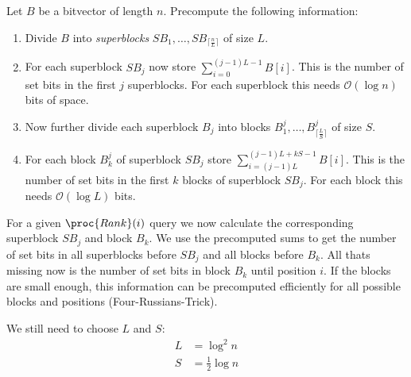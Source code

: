 \begin{Proof}
  Let $B$ be a bitvector of length $n$. Precompute the following information:
  \begin{enumerate}
    \item Divide $B$ into \emph{superblocks} $SB_1, \ldots, SB_{\lceil \frac{n}{L} \rceil}$ of size $L$.
    \item For each superblock $SB_j$ now store $\sum_{i=0}^{(j-1)L-1} B[i]$. This is the number of set bits in the first $j$ superblocks. For each superblock this needs $\mathcal{O}(\log n)$ bits of space.
    \item Now further divide each superblock $B_j$ into blocks $B_1^j, \ldots, B_{\lceil \frac{L}{S} \rceil}^j$ of size $S$.
    \item For each block $B_k^j$ of superblock $SB_j$ store $\sum_{i=(j-1)L}^{(j-1)L+kS-1} B[i]$. This is the number of set bits in the first $k$ blocks of superblock $SB_j$. For each block this needs $\mathcal{O}(\log L)$ bits.
  \end{enumerate}
  For a given $\proc{Rank}(i)$ query we now calculate the corresponding superblock $SB_j$ and block $B_k$. We use the precomputed sums to get the number of set bits in all superblocks before $SB_j$ and all blocks before $B_k$. All thats missing now is the number of set bits in block $B_k$ until position $i$. If the blocks are small enough, this information can be precomputed efficiently for all possible blocks and positions (Four-Russians-Trick).

  We still need to choose $L$ and $S$:
  \begin{align}
    L &= \log^2 n \\
    S &= \frac{1}{2} \log n
  \end{align}


\end{Proof}
